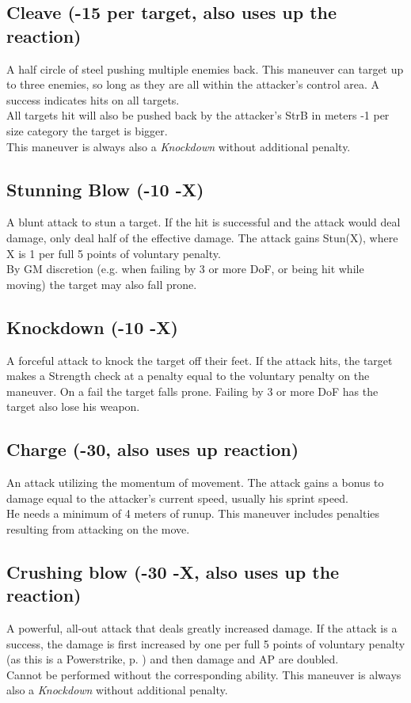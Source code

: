 \subsection*{Cleave (-15 per target, also uses up the reaction)}
A half circle of steel pushing multiple enemies back.
This maneuver can target up to three enemies,
	so long as they are all within the attacker’s control area.
A success indicates hits on all targets.\\
All targets hit will also be pushed back by the attacker’s StrB in meters -1 per size category the target is bigger.\\
This maneuver is always also a \emph{Knockdown} without additional penalty.
\subsection*{Stunning Blow (-10 -X)}
A blunt attack to stun a target.
If the hit is successful and the attack would deal damage,
	only deal half of the effective damage.
The attack gains Stun(X), where X is 1 per full 5 points of voluntary penalty.
\\%
By GM discretion
	(e.g. when failing by 3 or more DoF,
	or being hit while moving)
	the target may also fall prone.
\subsection*{Knockdown (-10 -X)}
A forceful attack to knock the target off their feet. If the attack hits, the target makes a Strength check at a penalty equal to the voluntary penalty on the maneuver. On a fail the target falls prone. Failing by 3 or more DoF has the target also lose his weapon.
\subsection*{Charge (-30, also uses up reaction)}
An attack utilizing the momentum of movement.
The attack gains a bonus to damage equal to the attacker’s current speed,
	usually his sprint speed.
\\%
He needs a minimum of 4 meters of runup.
This maneuver includes penalties resulting from attacking on the move.
\subsection*{Crushing blow (-30 -X, also uses up the reaction)}
A powerful, all-out attack that deals greatly increased damage.
If the attack is a success,
	the damage is first increased by one per full 5 points of voluntary penalty
	(as this is a Powerstrike, p. \pageref{mvr:powerstrike}) and
	then damage and AP are doubled.\\
Cannot be performed without the corresponding ability. This maneuver is always also a \emph{Knockdown} without additional penalty.

